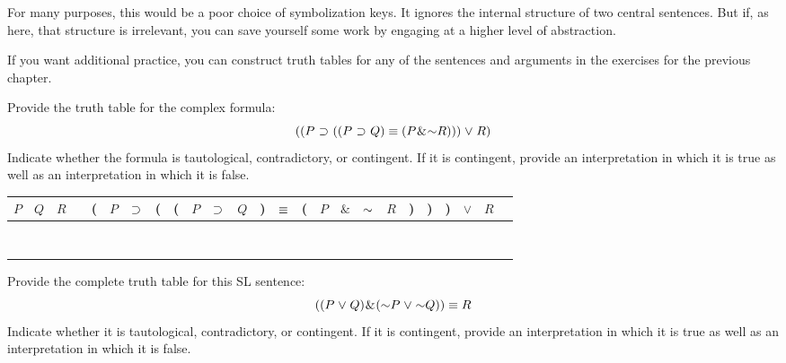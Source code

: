 For many purposes, this would be a poor choice of symbolization keys.
It ignores the internal structure of two central sentences.
But if, as here, that structure is irrelevant, you can save yourself some work by engaging at a higher level of abstraction.




\iffalse

\practiceproblems
If you want additional practice, you can construct truth tables for any of the sentences and arguments in the exercises for the previous chapter.



\problempart
\label{HW2.E}
Provide the truth table for the complex formula:
$$((P \eif (( P \eif Q) \eiff (P \eand \enot R))) \eor R)$$
Indicate whether the formula is tautological, contradictory, or contingent.
If it is contingent, provide an interpretation in which it is true as well as an interpretation in which it is false.


\begin{tabular}{@{ }c@{ }@{ }c@{ }@{ }c | c@{ }@{}c@{}@{ }c@{ }@{ }c@{ }@{}c@{}@{}c@{}@{ }c@{ }@{ }c@{ }@{ }c@{ }@{}c@{}@{ }c@{ }@{}c@{}@{ }c@{ }@{ }c@{ }@{ }c@{ }@{ }c@{ }@{}c@{}@{}c@{}@{}c@{}@{ }c@{ }@{ }c@{ }@{ }c}
$P$ & $Q$ & $R$ &  & ( & $P$ & $\mkern1mu\supset\mkern1mu $ & ( & ( & $P$ & $\mkern1mu\supset\mkern1mu $ & $Q$ & ) & $\equiv $ & ( & $P$ & $\&$ & $\enot$ & $R$ & ) & ) & ) & $\lor$ & $R$ & \\
\hline 
 &  &  &  &  &  &  &  &  &  &  &  &  &  &  &  &  &  &  &  &  &  &  & & \\
 &  &  &  &  &  &  &  &  &  &  &  &  &  &  &  &  &  &  &  &  &  &  & & \\
  &  &  &  &  &  &  &  &  &  &  &  &  &  &  &  &  &  &  &  &  &  &  & & \\
 &  &  &  &  &  &  &  &  &  &  &  &  &  &  &  &  &  &  &  &  &  &  & & \\
 &  &  &  &  &  &  &  &  &  &  &  &  &  &  &  &  &  &  &  &  &  &  & & \\
  &  &  &  &  &  &  &  &  &  &  &  &  &  &  &  &  &  &  &  &  &  &  & & \\
 &  &  &  &  &  &  &  &  &  &  &  &  &  &  &  &  &  &  &  &  &  &  & & \\
  &  &  &  &  &  &  &  &  &  &  &  &  &  &  &  &  &  &  &  &  &  &  & & \\
\end{tabular}




\problempart
\label{HW3.A}
Provide the complete truth table for this SL sentence:
$$((P \eor Q) \eand (\enot P \eor \enot Q)) \eiff R$$
Indicate whether it is tautological, contradictory, or contingent. 
If it is contingent, provide an interpretation in which it is true as well as an interpretation in which it is false.



